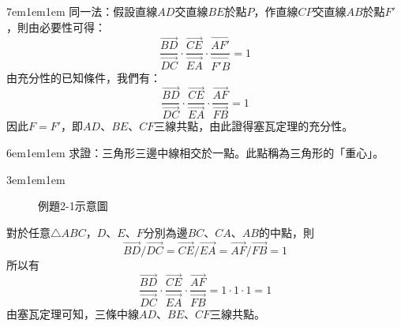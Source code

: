 \documentclass[12pt]{article}
\newif\ifshow
\begin{document}
\begin{mybox}[充分性證明]{7em}{1em}{1em}
    同一法：假設直線$AD$交直線$BE$於點$P$，作直線$CP$交直線$AB$於點$F'$，則由必要性可得：
    \[
        \frac{\overrightarrow{BD}}{\overrightarrow{DC}}
        \cdot\frac{\overrightarrow{CE}}{\overrightarrow{EA}}
        \cdot\frac{\overrightarrow{AF'}}{\overrightarrow{F'B}} = 1
    \]
    由充分性的已知條件，我們有：
    \[
        \frac{\overrightarrow{BD}}{\overrightarrow{DC}}
        \cdot\frac{\overrightarrow{CE}}{\overrightarrow{EA}}
        \cdot\frac{\overrightarrow{AF}}{\overrightarrow{FB}}= 1
    \]
    因此$F=F'$，即$AD$、$BE$、$CF$三線共點，由此證得塞瓦定理的充分性。
\end{mybox}
\fi
\begin{mybox}[例題\thesection-1]{6em}{1em}{1em}
    求證：三角形三邊中線相交於一點。此點稱為三角形的「重心」。
\end{mybox}
\ifshow
\begin{mybox}[解]{3em}{1em}{1em}
    \begin{figure}[H]
        \centering 
        \caption{例題2-1示意圖}
        \label{fig:coline_s2-1}
    \end{figure}
    對於任意$\triangle{ABC}$，$D$、$E$、$F$分別為邊$BC$、$CA$、$AB$的中點，則
    \begin{equation}
        \overrightarrow{BD}/\overrightarrow{DC}=\overrightarrow{CE}/\overrightarrow{EA}=\overrightarrow{AF}/\overrightarrow{FB}=1
    \end{equation}
    所以有
    \begin{equation}
        \frac{\overrightarrow{BD}}{\overrightarrow{DC}}
        \cdot\frac{\overrightarrow{CE}}{\overrightarrow{EA}}
        \cdot\frac{\overrightarrow{AF}}{\overrightarrow{FB}}=1\cdot 1\cdot 1=1
    \end{equation}
    由塞瓦定理可知，三條中線$AD$、$BE$、$CF$三線共點。
\end{mybox}
\end{document}
